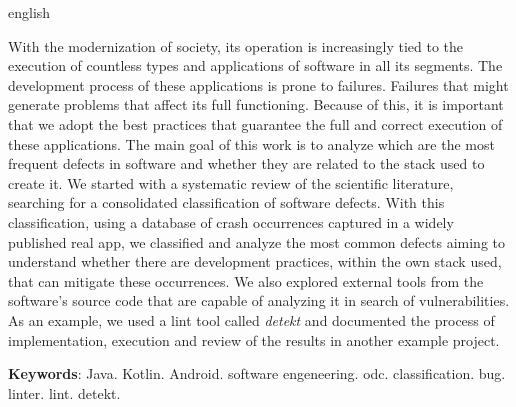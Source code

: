 \begin{resumo}[Abstract]
 \begin{otherlanguage*}{english}

With the modernization of society, its operation is increasingly tied to the execution of countless types and applications of software in all its segments. The development process of these applications is prone to failures. Failures that might generate problems that affect its full functioning. Because of this, it is important that we adopt the best practices that guarantee the full and correct execution of these applications. The main goal of this work is to analyze which are the most frequent defects in software and whether they are related to the stack used to create it. We started with a systematic review of the scientific literature, searching for a consolidated classification of software defects. With this classification, using a database of crash occurrences captured in a widely published real app, we classified and analyze the most common defects aiming to understand whether there are development practices, within the own stack used, that can mitigate these occurrences. We also explored external tools from the software's source code that are capable of analyzing it in search of vulnerabilities. As an example, we used a lint tool called \textit{detekt} and documented the process of implementation, execution and review of the results in another example project.

\vspace{\onelineskip}
 
\noindent 
\textbf{Keywords}: Java. Kotlin. Android. software engeneering. odc. classification. bug. linter. lint. detekt.
 \end{otherlanguage*}
\end{resumo}